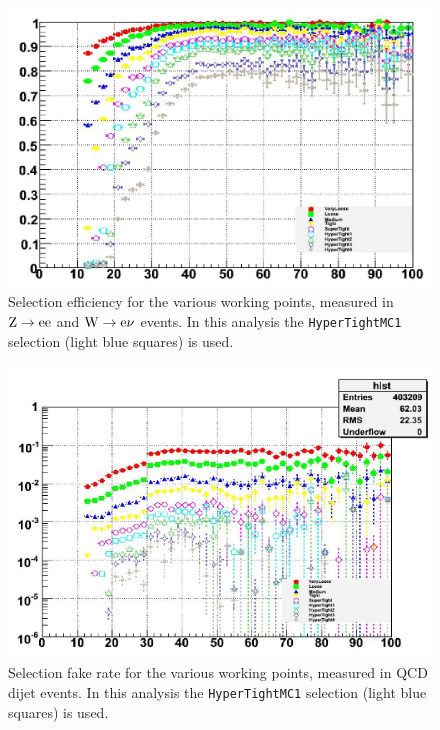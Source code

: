 \begin{figure}[htb]
    \centering
    \includegraphics[width=.8\textwidth]{images/pdf/hyper_tight_efficiency}
    \caption{Selection efficiency for the various working points, measured
    in $\mathrm{Z} \rightarrow \mathrm{e} \mathrm{e}$ and $\mathrm{W} \rightarrow \mathrm{e} \nu$ events. In this
    analysis the \texttt{HyperTightMC1} selection (light blue squares) is used.}
    \label{fig:hyper_tight_efficiency}
\end{figure}
\begin{figure}[htb]
    \centering
    \includegraphics[width=.8\textwidth]{images/pdf/hyper_tight_fake_rate}
    \caption{Selection fake rate for the various working points, measured
    in QCD dijet events. In this
    analysis the \texttt{HyperTightMC1} selection (light blue squares) is used.}
    \label{fig:hyper_tight_fake_rate}
\end{figure}

